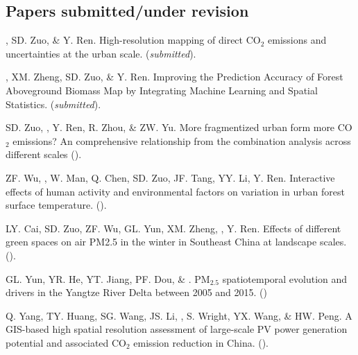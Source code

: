 \subsection*{Papers submitted/under revision}
\begin{etaremune}
\item
    \Shaoqing, SD. Zuo, \& Y. Ren.
    High-resolution mapping of direct CO$_2$ emissions and uncertainties at the urban scale. 
    (\textit{submitted}).
\item
    \Shaoqing\CF, XM. Zheng, SD. Zuo, \& Y. Ren.
    Improving the Prediction Accuracy of Forest Aboveground Biomass Map by Integrating Machine Learning and Spatial Statistics. 
    (\textit{submitted}).
\item
    SD. Zuo, \Shaoqing, Y. Ren, R. Zhou, \&  ZW. Yu.
    More fragmentized urban form more CO$_2$ emissions? An comprehensive relationship from the combination analysis across different scales 
    (\Review).
\item
    ZF. Wu, \Shaoqing, W. Man, Q. Chen, SD. Zuo, JF. Tang, YY. Li, Y. Ren.
    Interactive effects of human activity and environmental factors on variation in urban forest surface temperature. 
    (\Review).
\item
    LY. Cai, SD. Zuo, ZF. Wu, GL. Yun, XM. Zheng, \Shaoqing, Y. Ren.
    Effects of different green spaces on air PM2.5 in the winter in Southeast China at landscape scales.
    (\Review).
\item
    GL. Yun, YR. He, YT. Jiang, PF. Dou, \& \Shaoqing.
    PM$_2.5$ spatiotemporal evolution and drivers in the Yangtze River Delta between 2005 and 2015.
    (\Review)
\item
    Q. Yang, TY. Huang, SG. Wang, JS. Li, \Shaoqing, S. Wright, YX. Wang, \& HW. Peng.
    A GIS-based high spatial resolution assessment of large-scale PV power generation potential and associated CO$_2$ emission reduction in China.
    (\Review).
\end{etaremune}
